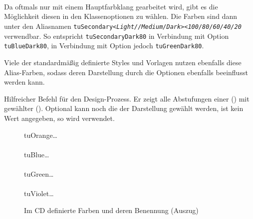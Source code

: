 \begin{Declaration}
  \\
  \\
  \\
\end{Declaration}

\begin{sloppypar}
Da oftmals nur mit einem Hauptfarbklang gearbeitet wird, gibt es die Möglichkeit
diesen in den Klassenoptionen zu wählen. Die Farben sind dann unter den
Aliasnamen
\texttt{tuSecondary\textit{<Light//Medium/Dark>}\textit{<100/80/60/40/20}}
verwendbar.
So entspricht \texttt{tuSecondaryDark80} in Verbindung mit Option
 \texttt{tuBlueDark80}, in Verbindung mit Option 
jedoch \texttt{tuGreenDark80}.
\end{sloppypar}

Viele der standardmäßig definierte Styles und Vorlagen nutzen ebenfalls diese
Alias-Farben, sodass deren Darstellung durch die Optionen ebenfalls beeinflusst 
werden kann.

\begin{Declaration}
\end{Declaration}

\begin{sloppypar}
Hilfreicher Befehl für den Design-Prozess. Er zeigt alle Abstufungen
einer  () mit gewählter 
 ().
Optional kann noch die  der Darstellung gewählt werden,
ist kein Wert angegeben, so wird  verwendet.
\end{sloppypar}

\begin{figure}
  tuOrange\ldots\\
  \\[-1ex]
  tuBlue\ldots\\
  \\[-1ex]
  tuGreen\ldots\\
  \\[-1ex]
  tuViolet\ldots\\
  \caption{Im CD definierte Farben und deren Benennung (Auszug)}
\end{figure}


